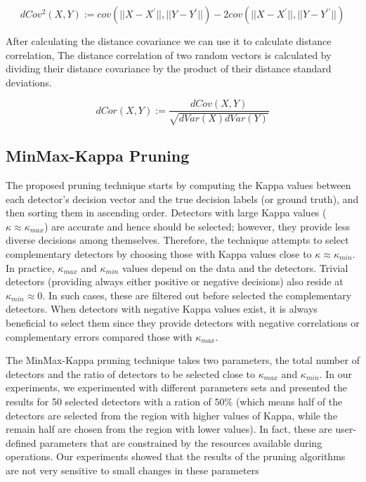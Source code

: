 \begin{equation}
\label{eq:distance_covariance_peasron}
dCov^2 (X, Y) := cov(|| X - X^{\prime}||, || Y - Y^{\prime}||) -  2cov(|| X - X^{\prime}||, || Y - Y^{\prime\prime}||)
\end{equation}

After calculating the distance covariance we can use it to calculate distance correlation, The distance correlation of two random vectors is calculated by dividing their distance covariance by the product of their distance standard deviations. 

\begin{equation}
\label{eq:distance_correlation}
dCor (X, Y) := \frac{dCov(X,Y)}{\sqrt{dVar(X)dVar(Y)}}
\end{equation}

\subsection{MinMax-Kappa Pruning}
\label{sub:minmax-kappa}


The proposed pruning technique starts by computing the Kappa values between each detector's decision vector and the true decision labels (or ground truth), and then sorting them in ascending order.
Detectors with large Kappa values ($\kappa \approx \kappa_{max}$) are accurate and hence should be selected; however, they provide less diverse decisions among themselves.
Therefore, the technique attempts to select complementary detectors by choosing those with Kappa values close to $\kappa \approx \kappa_{min}$.
In practice, $\kappa_{max}$ and $\kappa_{min}$ values depend on the data and the detectors.
Trivial detectors (providing always either positive or negative decisions) also reside at $\kappa_{min} \approx 0$.
In such cases, these are filtered out before selected the complementary detectors.
When detectors with negative Kappa values exist, it is always beneficial to select them since they provide detectors with negative correlations or complementary errors compared those with $\kappa_{max}$.

The MinMax-Kappa pruning technique takes two parameters, the total number of detectors and the ratio of detectors to be selected close to  $\kappa_{max}$  and $\kappa_{min}$.
In our experiments, we experimented with different parameters sets and presented the results for 50 selected detectors with a ration of $50\%$ (which means half of the detectors are selected from the region with higher values of Kappa, while the remain half are chosen from the region with lower values). In fact, these are user-defined parameters that are constrained by the resources available during operations. Our experiments showed that the results of the pruning algorithms are not very sensitive to small changes in these parameters

